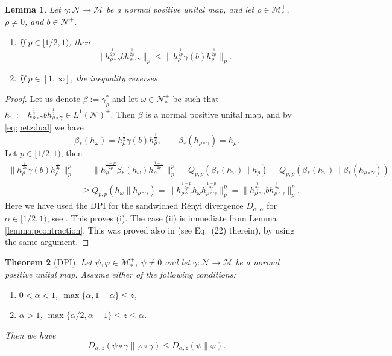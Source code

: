 \documentclass[12pt]{article}
\newtheorem{theorem}{Theorem}[section]
\newtheorem{lemma}[theorem]{Lemma}
\theoremstyle{definition}
\theoremstyle{remark}
\numberwithin{equation}{section}
\def\Me{\mathcal M}
\def\Ne{\mathcal N}
\begin{document}
\begin{lemma}\label{lemma:dpi} Let $\gamma:\Ne\to \Me$ be a normal positive unital map, and
let $\rho\in \Me_*^+$, {$\rho\ne0$, and} $b\in \Ne^+$. 
\begin{enumerate}
\item[(i)]  If $p\in [1/2,1)$, then 
\[
\Big\|h_{\rho\circ\gamma}^{\frac{1}{2p}}bh_{\rho\circ\gamma}^{\frac{1}{2p}}\Big\|_p\le
\Big\|h_{\rho}^{\frac{1}{2p}}\gamma(b)h_{\rho}^{\frac{1}{2p}}\Big\|_p.
\]

\item[(ii)]  If $p\in [1,\infty]$, the inequality reverses.
\end{enumerate}
\end{lemma}

\begin{proof} Let us denote $\beta:=\gamma_\rho^*$ and let $\omega\in {\Ne_*^+}$ be such
that 
$h_\omega:=h_{\rho\circ\gamma}^{\frac12}bh_{\rho\circ\gamma}^{\frac12}\in L^1(\Ne)^+$. Then
$\beta$ is a normal positive unital map, and {by \eqref{eq:petzdual}} we have
\[
\beta_*(h_\omega)=h_\rho^{\frac12}\gamma(b)h_\rho^{\frac12},\qquad
\beta_*(h_{\rho\circ\gamma})=h_\rho.
\]
Let $p\in [1/2,1)$, then  
\begin{align*}
\Big\|h_{\rho}^{\frac{1}{2p}}\gamma(b)h_{\rho}^{\frac{1}{2p}}\Big\|^p_p
&=\Big\|h_\rho^{\frac{1-p}{2p}}\beta_*(h_\omega)h_\rho^{\frac{1-p}{2p}}\Big\|_p^p
=Q_{p,p}(\beta_*(h_\omega)\|h_\rho)=Q_{p,p}(\beta_*(h_\omega)\|\beta_*(h_{\rho\circ\gamma}))\\
&\ge  Q_{p,p}(h_\omega\|h_{\rho\circ\gamma})=\Big\|h_{\rho\circ\gamma}^{\frac{1-p}{2p}}h_\omega
h_{\rho\circ\gamma}^{\frac{1-p}{2p}}\Big\|_p^p
=\Big\|h_{\rho\circ\gamma}^{\frac{1}{2p}}bh_{\rho\circ\gamma}^{\frac{1}{2p}}\Big\|^p_p.
\end{align*}
Here we have used the DPI for the sandwiched R\'enyi  divergence $D_{\alpha,\alpha}$ for
$\alpha\in [1/2,1)$; see \cite[Theorem 4.1]{jencova2021renyi}. This proves (i).
The case (ii) is immediate from Lemma \ref{lemma:pcontraction}. This was proved also 
in \cite{kato2023onrenyi} (see Eq.~(22) therein), by using the same argument.
\end{proof}

\begin{theorem}[DPI] \label{thm:dpi}
Let $\psi,\varphi\in \Me_*^+$, $\psi\ne 0$ and let $\gamma:\Ne\to \Me$ be a normal positive
unital map. Assume either of the following conditions:
\begin{enumerate}
\item[(i)] $0<\alpha<1$, $\max\{\alpha,1-\alpha\}\le z$,
\item[(ii)] $\alpha>1$, $\max\{\alpha/2,\alpha-1\}\le z\le \alpha$.
\end{enumerate}
Then we have
\[
D_{\alpha,z}(\psi\circ\gamma\|\varphi\circ\gamma)\le D_{\alpha,z}(\psi\|\varphi).
\]
\end{theorem}
\end{document}
